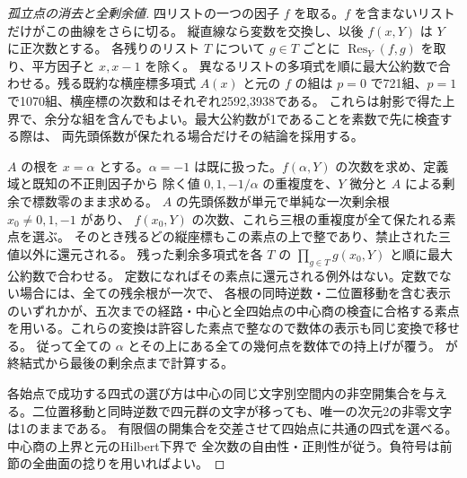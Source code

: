 \begin{proof}[孤立点の消去と全剰余値]
四リストの一つの因子 $f$ を取る。$f$ を含まないリストだけがこの曲線をさらに切る。
縦直線なら変数を交換し、以後 $f(x,Y)$ は $Y$ に正次数とする。
各残りのリスト $T$ について $g\in T$ ごとに $\operatorname{Res}_Y(f,g)$ を取り、平方因子と $x,x-1$ を除く。
異なるリストの多項式を順に最大公約数で合わせる。残る既約な横座標多項式 $A(x)$ と元の $f$ の組は
$p=0$ で721組、$p=1$ で1070組、横座標の次数和はそれぞれ2592,3938である。
これらは射影で得た上界で、余分な組を含んでもよい。最大公約数が1であることを素数で先に検査する際は、
両先頭係数が保たれる場合だけその結論を採用する。

$A$ の根を $x=\alpha$ とする。$\alpha=-1$ は既に扱った。$f(\alpha,Y)$ の次数を求め、定義域と既知の不正則因子から
除く値 $0,1,-1/\alpha$ の重複度を、$Y$ 微分と $A$ による剰余で標数零のまま求める。
$A$ の先頭係数が単元で単純な一次剰余根 $x_0\ne0,1,-1$ があり、
$f(x_0,Y)$ の次数、これら三根の重複度が全て保たれる素点を選ぶ。
そのとき残るどの縦座標もこの素点の上で整であり、禁止された三値以外に還元される。
残った剰余多項式を各 $T$ の $\prod_{g\in T}g(x_0,Y)$ と順に最大公約数で合わせる。
定数になればその素点に還元される例外はない。定数でない場合には、全ての残余根が一次で、
各根の同時逆数・二位置移動を含む表示のいずれかが、五次までの経路・中心と全四始点の中心商の検査に合格する素点を用いる。これらの変換は許容した素点で整なので数体の表示も同じ変換で移せる。
従って全ての $\alpha$ とその上にある全ての幾何点を数体での持上げが覆う。
 が終結式から最後の剰余点まで計算する。

各始点で成功する四式の選び方は中心の同じ文字別空間内の非空開集合を与える。二位置移動と同時逆数で四元群の文字が移っても、唯一の次元2の非零文字は1のままである。
有限個の開集合を交差させて四始点に共通の四式を選べる。中心商の上界と元のHilbert下界で
全次数の自由性・正則性が従う。負符号は前節の全曲面の捻りを用いればよい。
\end{proof}
